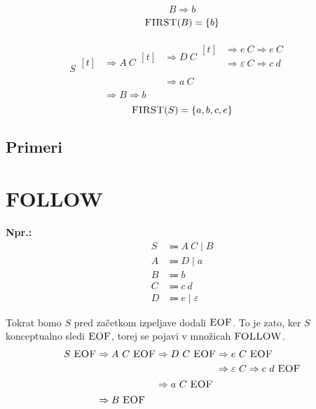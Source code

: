 \documentclass{article}
\newcommand{\Ex}{\textbf{Npr.:}\ }
\newcommand{\FIRST}{\textsc{FIRST}}
\newcommand{\FOLLOW}{\textsc{FOLLOW}}
\newcommand{\EOF}{\textsc{EOF}}
\newcommand{\Null}{\varepsilon}
\newcommand{\Arrow}{\Coloneqq}
\newcommand{\Derive}{\Rightarrow}
\newcommand{\Seq}{\ }
\newcommand{\Union}{\mathrel{|}}
\begin{document}
\begin{equation*}
  B \Derive b
\end{equation*}
\begin{equation*}
  \FIRST(B) = \{b\}
\end{equation*}

\begin{equation*}
  S \begin{aligned}[t]
    &\Derive A \Seq C \begin{aligned}[t]
      &\Derive D \Seq C \begin{aligned}[t]
        &\Derive e \Seq C \Derive e \Seq C \\
        &\Derive \Null \Seq C \Derive c \Seq d \\
      \end{aligned}\\
      &\Derive a \Seq C
    \end{aligned}\\
  &\Derive B \Derive b
  \end{aligned}
\end{equation*}
\begin{equation*}
  \FIRST(S) = \{a, b, c, e\}
\end{equation*}

\subsection*{Primeri}

\section{\FOLLOW}
\Ex
  \begin{equation*}
  \begin{aligned}
    S &\Arrow A \Seq C \Union B \\
    A &\Arrow D \Union a \\
    B &\Arrow b\\
    C &\Arrow c \Seq d\\
    D &\Arrow e \Union \Null
  \end{aligned}
\end{equation*}

Tokrat bomo $S$ pred začetkom izpeljave dodali $\EOF$.
To je zato, ker $S$ konceptualno sledi $\EOF$, torej se pojavi v množicah $\FOLLOW$.
\begin{equation*}
  S \Seq \EOF \begin{aligned}[t]
    &\Derive A \Seq C \Seq \EOF \begin{aligned}[t]
      &\Derive D \Seq C \Seq \EOF \begin{aligned}[t]
        &\Derive e \Seq C \Seq \EOF\\
        &\Derive \Null \Seq C \Derive c \Seq d \Seq \EOF
      \end{aligned}\\
      &\Derive a \Seq C \Seq \EOF
    \end{aligned}\\
  &\Derive B \Seq \EOF
  \end{aligned}
\end{equation*}
\end{document}
